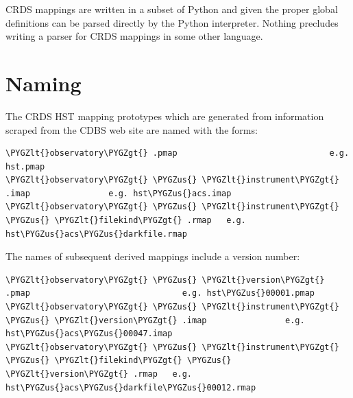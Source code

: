 \documentclass[letterpaper,10pt,english]{sphinxmanual}
\def\PYGZus{\char`\_}
\def\PYGZlt{\char`\<}
\def\PYGZgt{\char`\>}
\begin{document}
CRDS mappings are written in a subset of Python and given the proper global
definitions can be parsed directly by the Python interpreter.   Nothing
precludes writing a parser for CRDS mappings in some other language.
\begin{figure}[htbp]
\centering

\end{figure}


\section{Naming}
\label{rmap_syntax:naming}
The CRDS HST mapping prototypes which are generated from information scraped from
the CDBS web site are named with the forms:

\begin{Verbatim}[commandchars=\\\{\}]
\PYGZlt{}observatory\PYGZgt{} .pmap                               e.g. hst.pmap
\PYGZlt{}observatory\PYGZgt{} \PYGZus{} \PYGZlt{}instrument\PYGZgt{} .imap                e.g. hst\PYGZus{}acs.imap
\PYGZlt{}observatory\PYGZgt{} \PYGZus{} \PYGZlt{}instrument\PYGZgt{} \PYGZus{} \PYGZlt{}filekind\PYGZgt{} .rmap   e.g. hst\PYGZus{}acs\PYGZus{}darkfile.rmap
\end{Verbatim}

The names of subsequent derived mappings include a version number:

\begin{Verbatim}[commandchars=\\\{\}]
\PYGZlt{}observatory\PYGZgt{} \PYGZus{} \PYGZlt{}version\PYGZgt{} .pmap                               e.g. hst\PYGZus{}00001.pmap
\PYGZlt{}observatory\PYGZgt{} \PYGZus{} \PYGZlt{}instrument\PYGZgt{} \PYGZus{} \PYGZlt{}version\PYGZgt{} .imap                e.g. hst\PYGZus{}acs\PYGZus{}00047.imap
\PYGZlt{}observatory\PYGZgt{} \PYGZus{} \PYGZlt{}instrument\PYGZgt{} \PYGZus{} \PYGZlt{}filekind\PYGZgt{} \PYGZus{} \PYGZlt{}version\PYGZgt{} .rmap   e.g. hst\PYGZus{}acs\PYGZus{}darkfile\PYGZus{}00012.rmap
\end{Verbatim}
\end{document}
